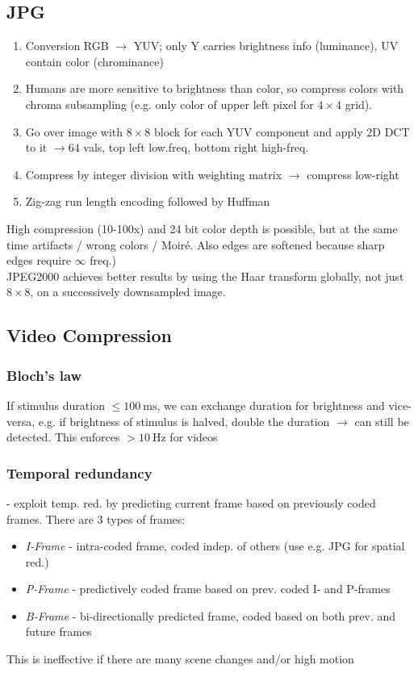 \documentclass[a4paper,10pt]{article}
\begin{document}
\subsection{JPG}
\begin{enumerate}
    \item Conversion RGB \( \to \) YUV; only Y carries brightness info (luminance), UV contain color (chrominance)
    \item Humans are more sensitive to brightness than color, so compress colors with chroma subsampling (e.g. only color of upper left pixel for \( 4\times 4\) grid).
    \item Go over image with \( 8 \times 8 \) block for each YUV component and apply 2D DCT to it \( \rightarrow 64 \) vals, top left low.freq, bottom right high-freq.
    \item Compress by integer division with weighting matrix \( \rightarrow \) compress low-right
    \item Zig-zag run length encoding followed by Huffman
\end{enumerate}
High compression (10-100x) and 24 bit color depth is possible, but at the same time artifacts / wrong colors / Moiré. Also edges are softened because sharp edges require \( \infty \) freq.)\\
JPEG2000 achieves better results by using the Haar transform globally, not just \( 8 \times 8 \), on a successively downsampled image.

\subsection{Video Compression}
\subsubsection{Bloch's law} If stimulus duration \( \le \qty{100}{\milli\second}\), we can exchange duration for brightness and vice-versa, e.g. if brightness of stimulus is halved, double the duration \( \rightarrow \) can still be detected. This enforces \( > \qty{10}{\hertz} \) for videos
\subsubsection{Temporal redundancy} - exploit temp. red. by predicting current frame based on previously coded frames. There are 3 types of frames:
    \begin{itemize}
	\item \textit{I-Frame} - intra-coded frame, coded indep. of others (use e.g. JPG for spatial red.)
	\item \textit{P-Frame} - predictively coded frame based on prev. coded I- and P-frames
	\item \textit{B-Frame} - bi-directionally predicted frame, coded based on both prev. and future frames
    \end{itemize}
    This is ineffective if there are many scene changes and/or high motion
\end{document}
